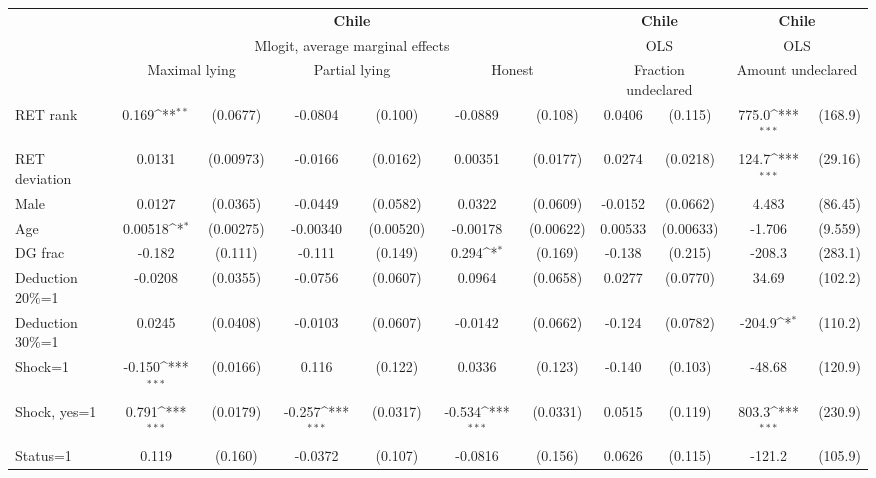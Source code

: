 \def\sym#1{\ifmmode^{#1}\else\(^{#1}\)\fi}
\begin{tabular}{l|cccccc|cc|cc}
\hline\hline
&\multicolumn{6}{c|}{\bf Chile}&\multicolumn{2}{c|}{\bf Chile}&\multicolumn{2}{c}{\bf Chile}\\ &\multicolumn{6}{c|}{Mlogit, average marginal effects }&\multicolumn{2}{c|}{OLS}&\multicolumn{2}{c}{OLS}\\
                &\multicolumn{2}{c}{Maximal lying}&\multicolumn{2}{c}{Partial lying}&\multicolumn{2}{c}{Honest}  &\multicolumn{2}{c}{Fraction undeclared}&\multicolumn{2}{c}{Amount undeclared}\\
\hline
RET rank        &    0.169\sym{**} & (0.0677)&  -0.0804         &  (0.100)&  -0.0889         &  (0.108)&   0.0406         &  (0.115)&    775.0\sym{***}&  (168.9)\\
RET deviation   &   0.0131         &(0.00973)&  -0.0166         & (0.0162)&  0.00351         & (0.0177)&   0.0274         & (0.0218)&    124.7\sym{***}&  (29.16)\\
Male            &   0.0127         & (0.0365)&  -0.0449         & (0.0582)&   0.0322         & (0.0609)&  -0.0152         & (0.0662)&    4.483         &  (86.45)\\
Age             &  0.00518\sym{*}  &(0.00275)& -0.00340         &(0.00520)& -0.00178         &(0.00622)&  0.00533         &(0.00633)&   -1.706         &  (9.559)\\
DG frac         &   -0.182         &  (0.111)&   -0.111         &  (0.149)&    0.294\sym{*}  &  (0.169)&   -0.138         &  (0.215)&   -208.3         &  (283.1)\\
Deduction 20\%=1&  -0.0208         & (0.0355)&  -0.0756         & (0.0607)&   0.0964         & (0.0658)&   0.0277         & (0.0770)&    34.69         &  (102.2)\\
Deduction 30\%=1&   0.0245         & (0.0408)&  -0.0103         & (0.0607)&  -0.0142         & (0.0662)&   -0.124         & (0.0782)&   -204.9\sym{*}  &  (110.2)\\
Shock=1         &   -0.150\sym{***}& (0.0166)&    0.116         &  (0.122)&   0.0336         &  (0.123)&   -0.140         &  (0.103)&   -48.68         &  (120.9)\\
Shock, yes=1    &    0.791\sym{***}& (0.0179)&   -0.257\sym{***}& (0.0317)&   -0.534\sym{***}& (0.0331)&   0.0515         &  (0.119)&    803.3\sym{***}&  (230.9)\\
Status=1        &    0.119         &  (0.160)&  -0.0372         &  (0.107)&  -0.0816         &  (0.156)&   0.0626         &  (0.115)&   -121.2         &  (105.9)\\

\end{tabular}
